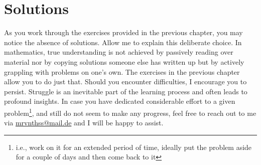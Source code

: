 \chapter{Solutions}

As you work through the exercises provided in the previous chapter, you may notice the absence of solutions. Allow me to explain this deliberate choice. In mathematics, true understanding is not achieved by passively reading over material nor by copying solutions someone else has written up but by actively grappling with problems on one's own. The exercises in the previous chapter allow you to do just that. Should you encounter difficulties, I encourage you to persist. Struggle is an inevitable part of the learning process and often leads to profound insights. In case you have dedicated considerable effort to a given problem\footnote{i.e., work on it for an extended period of time, ideally put the problem aside for a couple of days and then come back to it}, and still do not seem to make any progress, feel free to reach out to me via \href{mailto:mrvnthss@mail.de}{mrvnthss@mail.de} and I will be happy to assist.
